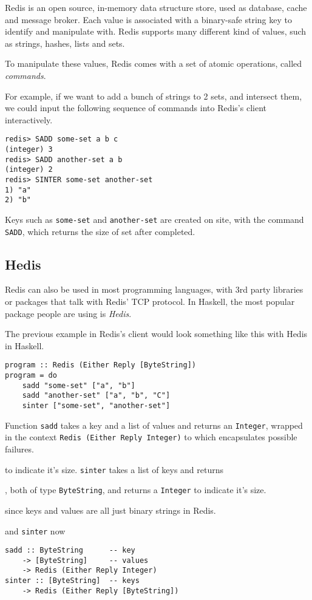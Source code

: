 \documentclass[pldi]{sigplanconf-pldi16}
\begin{document}
Redis is an open source, in-memory data structure store, used as
database, cache and message broker. Each value is associated with a binary-safe
string key to identify and manipulate with. Redis supports many different
kind of values, such as strings, hashes, lists and sets.


To manipulate these values, Redis comes with a set of atomic operations,
called \emph{commands}.

For example, if we want to add a bunch of strings to 2 sets, and intersect them,
we could input the following sequence of commands into Redis's client interactively.

\begin{verbatim}
redis> SADD some-set a b c
(integer) 3
redis> SADD another-set a b
(integer) 2
redis> SINTER some-set another-set
1) "a"
2) "b"
\end{verbatim}

Keys such as \texttt{some-set} and \texttt{another-set}
are created on site, with the command \texttt{SADD}, which returns
the size of set after completed.

\subsection{Hedis}
Redis can also be used in most programming languages, with 3rd party libraries
or packages that talk with Redis' TCP protocol. In Haskell, the most popular
package people are using is \emph{Hedis}.

The previous example in Redis's client would look something like this with Hedis
in Haskell.
\begin{verbatim}
program :: Redis (Either Reply [ByteString])
program = do
    sadd "some-set" ["a", "b"]
    sadd "another-set" ["a", "b", "C"]
    sinter ["some-set", "another-set"]
\end{verbatim}

Function \texttt{sadd} takes a key and a list of values and returns an
\texttt{Integer},
wrapped in the context \texttt{Redis (Either Reply Integer)}
to which encapsulates possible failures.

 to indicate it's size. \texttt{sinter}
takes a list of keys and returns



 , both of type
  \texttt{ByteString}, and returns a \texttt{Integer}
  to indicate it's size.

  since keys and values are all just binary strings in Redis.

 and \texttt{sinter} now

\begin{verbatim}
sadd :: ByteString      -- key
    -> [ByteString]     -- values
    -> Redis (Either Reply Integer)
sinter :: [ByteString]  -- keys
    -> Redis (Either Reply [ByteString])
\end{verbatim}
\end{document}
